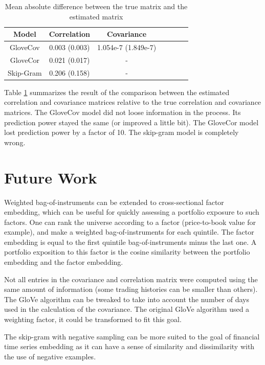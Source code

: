\documentclass[a4paper, 11pt]{article}
\begin{document}
\begin{table}[htb]
\begin{center}
\begin{tabular}{|c|c|c|c|c|c|c|}
  \hline
  Model & Correlation & Covariance \\
  \hline
  GloveCov & 0.003 (0.003) & 1.054e-7 (1.849e-7)\\
  GloveCor & 0.021 (0.017) & -\\
  Skip-Gram & 0.206 (0.158) & -\\
  \hline
\end{tabular}
\end{center}
\caption{Mean absolute difference between the true matrix and the estimated matrix}
\label{table:bagofstocks}
\end{table}

Table \ref{table:bagofstocks} summarizes the result of the comparison between the estimated correlation and covariance matrices relative to the true correlation and covariance matrices.
The GloveCov model did not loose information in the process. Its prediction power stayed the same (or improved a little bit). The GloveCor model lost prediction power by a factor of 10. The skip-gram model is completely wrong.   


\section{Future Work}
Weighted bag-of-instruments can be extended to cross-sectional factor embedding, which can be useful for quickly assessing a portfolio exposure to such factors. One can rank the universe according to a factor (price-to-book value for example), and make a weighted bag-of-instruments for each quintile. The factor embedding is equal to the first quintile bag-of-instruments minus the last one. A portfolio exposition to this factor is the cosine similarity between the portfolio embedding and the factor embedding.

Not all entries in the covariance and correlation matrix were computed using the same amount of information (some trading histories can be smaller than others). The GloVe algorithm can be tweaked to take into account the number of days used in the calculation of the covariance. The original GloVe algorithm used a weighting factor, it could be transformed to fit this goal.

The skip-gram with negative sampling can be more suited to the goal of financial time series embedding as it can have a sense of similarity and dissimilarity with the use of negative examples.
\end{document}
